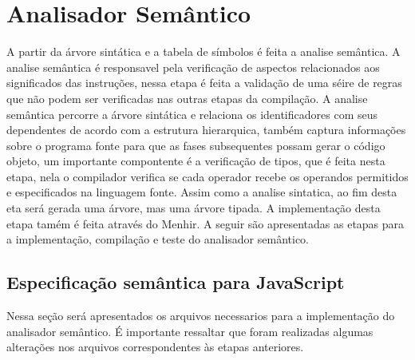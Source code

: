 \documentclass[12pt,a4paper,twoside]{article}
\begin{document}
\section{Analisador Semântico}
A partir da árvore sintática e a tabela de símbolos é feita a analise semântica. A analise semântica é responsavel pela verificação de aspectos relacionados aos significados das instruções, nessa etapa é feita a validação de uma séire de regras que não podem ser verificadas nas outras etapas da compilação. \newline
A analise semântica percorre a árvore sintática e relaciona os identificadores com seus dependentes de acordo com a estrutura hierarquica, também captura informações sobre o programa fonte para que as fases subsequentes possam gerar o código objeto, um importante compontente é a verificação de tipos, que é feita nesta etapa, nela o compilador verifica se cada operador recebe os operandos permitidos e especificados na linguagem fonte. \newline
Assim como a analise sintatica, ao fim desta eta será gerada uma árvore, mas uma árvore tipada. A implementação desta etapa tamém é feita através do Menhir. A seguir são apresentadas as etapas para a implementação, compilação e teste do analisador semântico.

\subsection{Especificação semântica para JavaScript}
Nessa seção será apresentados os arquivos necessarios para a implementação do analisador semântico. É importante ressaltar que foram realizadas algumas alterações nos arquivos correspondentes às etapas anteriores.
\end{document}
